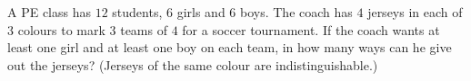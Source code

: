 A PE class has $12$ students, $6$ girls and $6$ boys. The coach has $4$ jerseys in each of $3$ colours to mark $3$ teams of $4$ for a soccer tournament. If the coach wants at least one girl and at least one boy on each team, in how many ways can he give out the jerseys? (Jerseys of the same colour are indistinguishable.)
